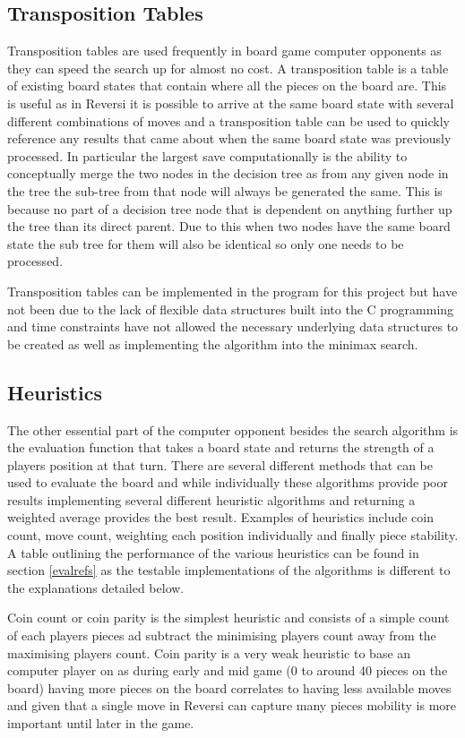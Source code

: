 \documentclass[final]{cmpreport}
\begin{document}
\subsection{Transposition Tables}
Transposition tables are used frequently in board game computer opponents as they can speed the search up for almost no cost. A transposition table is a table of existing board states that contain where all the pieces on the board are. This is useful as in Reversi it is possible to arrive at the same board state with several different combinations of moves and a transposition table can be used to quickly reference any results that came about when the same board state was previously processed. In particular the largest save computationally is the ability to conceptually merge the two nodes in the decision tree as from any given node in the tree the sub-tree from that node will always be generated the same. This is because no part of a decision tree node that is dependent on anything further up the tree than its direct parent. Due to this when two nodes have the same board state the sub tree for them will also be identical so only one needs to be processed.

Transposition tables can be implemented in the program for this project but have not been due to the lack of flexible data structures built into the C programming and time constraints have not allowed the necessary underlying data structures to be created as well as implementing the algorithm into the minimax search.
\subsection{Heuristics}\label{exheu}
The other essential part of the computer opponent besides the search algorithm is the evaluation function that takes a board state and returns the strength of a players position at that turn. There are several different methods that can be used to evaluate the board and while individually these algorithms provide poor results implementing several different heuristic algorithms and returning a weighted average provides the best result. Examples of heuristics include coin count, move count, weighting each position individually and finally piece stability. A table outlining the performance of the various heuristics can be found in section \ref{evalrefs} as the testable implementations of the algorithms is different to the explanations detailed below.


Coin count or coin parity is the simplest heuristic and consists of a simple count of each players pieces ad subtract the minimising players count away from the maximising players count. Coin parity is a very weak heuristic to base an computer player on as during early and mid game (0 to around 40 pieces on the board) having more pieces on the board correlates to having less available moves and given that a single move in Reversi can capture many pieces mobility is more important until later in the game.
\end{document}
